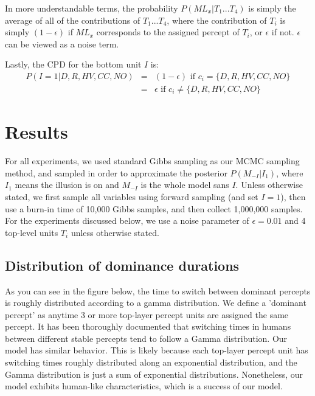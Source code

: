 \documentclass{article} %
\begin{document}
In more understandable terms, the probability $P(ML_x|T_1...T_4)$ is simply the average of all of the contributions of $T_1...T_4$, where the contribution of $T_i$ is simply $(1-\epsilon)$ if $ML_x$ corresponds to the assigned percept of $T_i$, or $\epsilon$ if not. $\epsilon$ can be viewed as a noise term.

Lastly, the CPD for the bottom unit $I$ is:
\begin{eqnarray*}
P(I=1|D,R,HV,CC,NO) &=& (1-\epsilon) \textrm{   if } c_i = \{D,R,HV,CC,NO\} \\
&=& \epsilon \textrm{   if } c_i \neq \{D,R,HV,CC,NO\}  
\end{eqnarray*}


\section{Results}
For all experiments, we used standard Gibbs sampling as our MCMC sampling method, and sampled in order to approximate the posterior $P(M_{-I}|I_1)$, where $I_1$ means the illusion is on and $M_{-I}$ is the whole model sans $I$. Unless otherwise stated, we first sample all variables using forward sampling (and set $I=1$), then use a burn-in time of 10,000 Gibbs samples, and then collect 1,000,000 samples. 
For the experiments discussed below, we use a noise parameter of $\epsilon = 0.01$ and 4 top-level units $T_i$ unless otherwise stated. \\ 



\subsection{Distribution of dominance durations}
As you can see in the figure below, the time to switch between dominant percepts is roughly distributed according to a gamma distribution. We define a 'dominant percept' as anytime 3 or more top-layer percept units are assigned the same percept. It has been thoroughly documented that switching times in humans between different stable percepts tend to follow a Gamma distribution. Our model has similar behavior. This is likely because each top-layer percept unit has switching times roughly distributed along an exponential distribution, and the Gamma distribution is just a sum of exponential distributions. Nonetheless, our model exhibits human-like characteristics, which is a success of our model. \\
\end{document}
